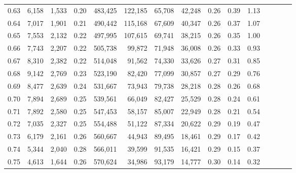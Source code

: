 \begin{tabular}{rrrcrrrrrrrrrrr}
0.63 &   6,158 &  1,533 &                                       0.20 &  483,425 &  122,185 &   65,708 &   42,248 &  0.26 &  0.39 &                         1.13 \\
0.64 &   7,017 &  1,901 &                                       0.21 &  490,442 &  115,168 &   67,609 &   40,347 &  0.26 &  0.37 &                         1.07 \\
0.65 &   7,553 &  2,132 &                                       0.22 &  497,995 &  107,615 &   69,741 &   38,215 &  0.26 &  0.35 &                         1.00 \\
0.66 &   7,743 &  2,207 &                                       0.22 &  505,738 &   99,872 &   71,948 &   36,008 &  0.26 &  0.33 &                         0.93 \\
0.67 &   8,310 &  2,382 &                                       0.22 &  514,048 &   91,562 &   74,330 &   33,626 &  0.27 &  0.31 &                         0.85 \\
0.68 &   9,142 &  2,769 &                                       0.23 &  523,190 &   82,420 &   77,099 &   30,857 &  0.27 &  0.29 &                         0.76 \\
0.69 &   8,477 &  2,639 &                                       0.24 &  531,667 &   73,943 &   79,738 &   28,218 &  0.28 &  0.26 &                         0.68 \\
0.70 &   7,894 &  2,689 &                                       0.25 &  539,561 &   66,049 &   82,427 &   25,529 &  0.28 &  0.24 &                         0.61 \\
0.71 &   7,892 &  2,580 &                                       0.25 &  547,453 &   58,157 &   85,007 &   22,949 &  0.28 &  0.21 &                         0.54 \\
0.72 &   7,035 &  2,327 &                                       0.25 &  554,488 &   51,122 &   87,334 &   20,622 &  0.29 &  0.19 &                         0.47 \\
0.73 &   6,179 &  2,161 &                                       0.26 &  560,667 &   44,943 &   89,495 &   18,461 &  0.29 &  0.17 &                         0.42 \\
0.74 &   5,344 &  2,040 &                                       0.28 &  566,011 &   39,599 &   91,535 &   16,421 &  0.29 &  0.15 &                         0.37 \\
0.75 &   4,613 &  1,644 &                                       0.26 &  570,624 &   34,986 &   93,179 &   14,777 &  0.30 &  0.14 &                         0.32 \\

\end{tabular}
